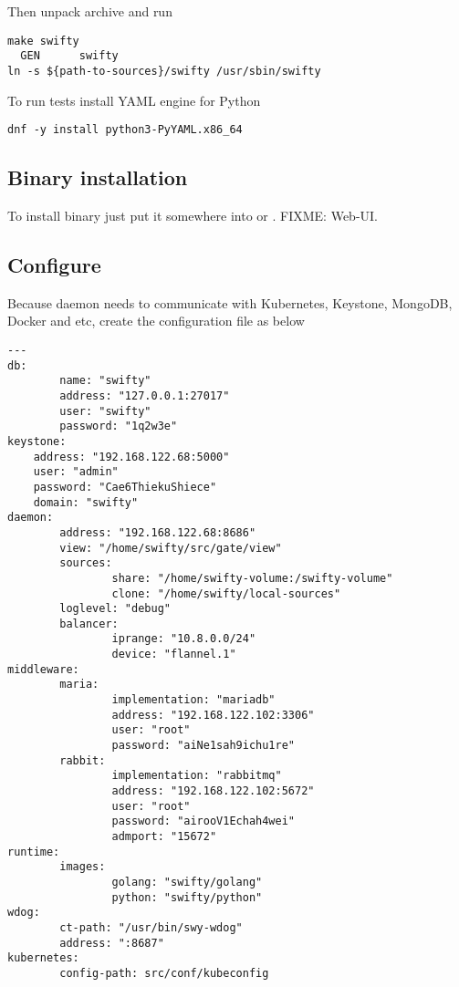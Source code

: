 Then unpack  archive and run

\begin{lstlisting}
make swifty
  GEN      swifty
ln -s ${path-to-sources}/swifty /usr/sbin/swifty
\end{lstlisting}

To run tests install YAML engine for Python

\begin{lstlisting}
dnf -y install python3-PyYAML.x86_64
\end{lstlisting}

\subsection{Binary installation}
\label{subsec:setup-swifty-bin}

To install binary just put it somewhere into 
or . FIXME: Web-UI.

\subsection{Configure}
\label{subsec:setup-swifty-conf}

Because  daemon needs to communicate with Kubernetes,
Keystone, MongoDB, Docker and etc, create the 
configuration file as below

\begin{lstlisting}
---
db:
        name: "swifty"
        address: "127.0.0.1:27017"
        user: "swifty"
        password: "1q2w3e"
keystone:
	address: "192.168.122.68:5000"
	user: "admin"
	password: "Cae6ThiekuShiece"
	domain: "swifty"
daemon:
        address: "192.168.122.68:8686"
        view: "/home/swifty/src/gate/view"
        sources:
                share: "/home/swifty-volume:/swifty-volume"
                clone: "/home/swifty/local-sources"
        loglevel: "debug"
        balancer:
                iprange: "10.8.0.0/24"
                device: "flannel.1"
middleware:
        maria:
                implementation: "mariadb"
                address: "192.168.122.102:3306"
                user: "root"
                password: "aiNe1sah9ichu1re"
        rabbit:
                implementation: "rabbitmq"
                address: "192.168.122.102:5672"
                user: "root"
                password: "airooV1Echah4wei"
                admport: "15672"
runtime:
        images:
                golang: "swifty/golang"
                python: "swifty/python"
wdog:
        ct-path: "/usr/bin/swy-wdog"
        address: ":8687"
kubernetes:
        config-path: src/conf/kubeconfig
\end{lstlisting}

